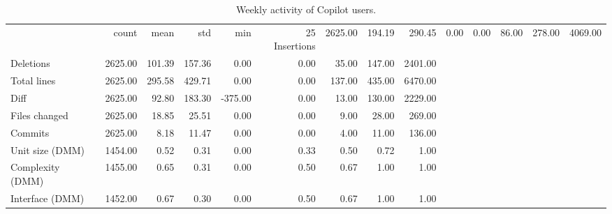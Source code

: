 \begin{table}
\caption{Weekly activity of Copilot users.}
\label{tab:weekly_act_copilot}
\begin{tabular}{lrrrrrrrr}
\toprule
 & count & mean & std & min & 25%
\midrule
Insertions & 2625.00 & 194.19 & 290.45 & 0.00 & 0.00 & 86.00 & 278.00 & 4069.00 \\
Deletions & 2625.00 & 101.39 & 157.36 & 0.00 & 0.00 & 35.00 & 147.00 & 2401.00 \\
Total lines & 2625.00 & 295.58 & 429.71 & 0.00 & 0.00 & 137.00 & 435.00 & 6470.00 \\
Diff & 2625.00 & 92.80 & 183.30 & -375.00 & 0.00 & 13.00 & 130.00 & 2229.00 \\
Files changed & 2625.00 & 18.85 & 25.51 & 0.00 & 0.00 & 9.00 & 28.00 & 269.00 \\
Commits & 2625.00 & 8.18 & 11.47 & 0.00 & 0.00 & 4.00 & 11.00 & 136.00 \\
Unit size (DMM) & 1454.00 & 0.52 & 0.31 & 0.00 & 0.33 & 0.50 & 0.72 & 1.00 \\
Complexity (DMM) & 1455.00 & 0.65 & 0.31 & 0.00 & 0.50 & 0.67 & 1.00 & 1.00 \\
Interface (DMM) & 1452.00 & 0.67 & 0.30 & 0.00 & 0.50 & 0.67 & 1.00 & 1.00 \\
\bottomrule
\end{tabular}
\end{table}
